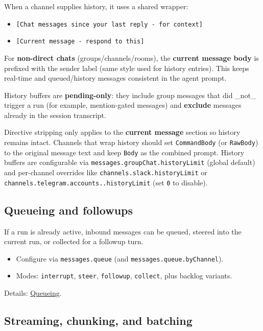 When a channel supplies history, it uses a shared wrapper:

\begin{itemize}
  \item \texttt{[Chat messages since your last reply - for context]}
  \item \texttt{[Current message - respond to this]}
\end{itemize}


For \textbf{non-direct chats} (groups/channels/rooms), the \textbf{current message body} is prefixed with the
sender label (same style used for history entries). This keeps real-time and queued/history
messages consistent in the agent prompt.

History buffers are \textbf{pending-only}: they include group messages that did \_not\_
trigger a run (for example, mention-gated messages) and \textbf{exclude} messages
already in the session transcript.

Directive stripping only applies to the \textbf{current message} section so history
remains intact. Channels that wrap history should set \texttt{CommandBody} (or
\texttt{RawBody}) to the original message text and keep \texttt{Body} as the combined prompt.
History buffers are configurable via \texttt{messages.groupChat.historyLimit} (global
default) and per-channel overrides like \texttt{channels.slack.historyLimit} or
\texttt{channels.telegram.accounts..historyLimit} (set \texttt{0} to disable).

\subsection{Queueing and followups}


If a run is already active, inbound messages can be queued, steered into the
current run, or collected for a followup turn.

\begin{itemize}
  \item Configure via \texttt{messages.queue} (and \texttt{messages.queue.byChannel}).
  \item Modes: \texttt{interrupt}, \texttt{steer}, \texttt{followup}, \texttt{collect}, plus backlog variants.
\end{itemize}


Details: \href{/concepts/queue}{Queueing}.

\subsection{Streaming, chunking, and batching}


